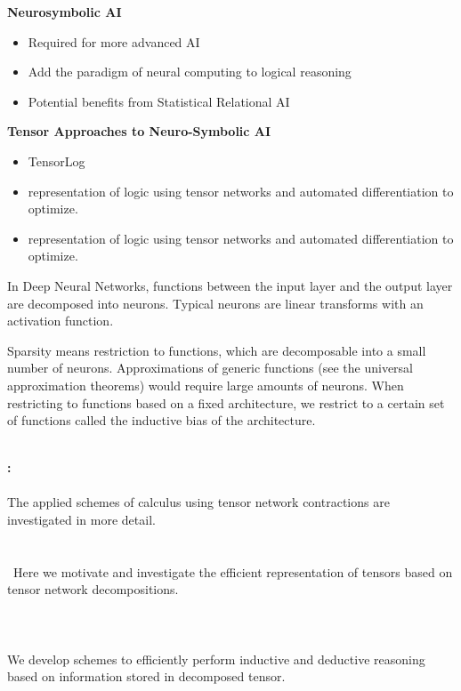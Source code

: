 \textbf{Neurosymbolic AI}
\begin{itemize}
    \item Required for more advanced AI \cite{hochreiter_toward_2022}
    \item Add the paradigm of neural computing to logical reasoning
    \item Potential benefits from Statistical Relational AI \cite{marra_statistical_2024}
\end{itemize}


\textbf{Tensor Approaches to Neuro-Symbolic AI}
\begin{itemize}
    \item TensorLog \cite{cohen_tensorlog_2020}
    \item \cite{badreddine_logic_2022} representation of logic using tensor networks and automated differentiation to optimize.
    \item \cite{badreddine_logic_2022} representation of logic using tensor networks and automated differentiation to optimize.
\end{itemize}

In Deep Neural Networks, functions between the input layer and the output layer are decomposed into neurons.
Typical neurons are linear transforms with an activation function.

Sparsity means restriction to functions, which are decomposable into a small number of neurons.
Approximations of generic functions (see the universal approximation theorems) would require large amounts of neurons. %
When restricting to functions based on a fixed architecture, we restrict to a certain set of functions called the inductive bias of the architecture.

\ \\
\textbf{: \partthreetext}\\
\ \\
The applied schemes of calculus using tensor network contractions are investigated in more detail.
\ \\
\textbf{\focusonespec}\\
\\\
Here we motivate and investigate the efficient representation of tensors based on tensor network decompositions. \\
\ \\
\textbf{\focustwospec}\\
\ \\
We develop schemes to efficiently perform inductive and deductive reasoning based on information stored in decomposed tensor.


%
%
%
%
